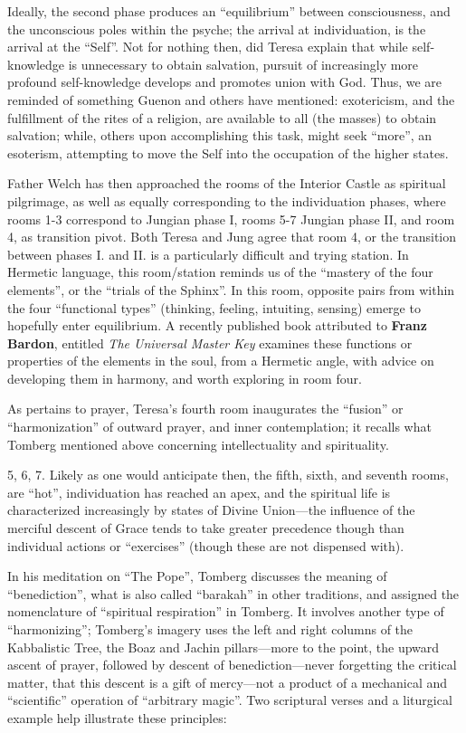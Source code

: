 Ideally, the second phase produces an ``equilibrium'' between consciousness, and the unconscious poles within the psyche; the arrival at individuation, is the arrival at the ``Self''. Not for nothing then, did Teresa explain that while self-knowledge is unnecessary to obtain salvation, pursuit of increasingly more profound self-knowledge develops and promotes union with God. Thus, we are reminded of something Guenon and others have mentioned: exotericism, and the fulfillment of the rites of a religion, are available to all (the masses) to obtain salvation; while, others upon accomplishing this task, might seek ``more'', an esoterism, attempting to move the Self into the occupation of the higher states.

Father Welch has then approached the rooms of the Interior Castle as spiritual pilgrimage, as well as equally corresponding to the individuation phases, where rooms 1-3 correspond to Jungian phase I, rooms 5-7 Jungian phase II, and room 4, as transition pivot. Both Teresa and Jung agree that room 4, or the transition between phases I. and II. is a particularly difficult and trying station. In Hermetic language, this room/station reminds us of the ``mastery of the four elements'', or the ``trials of the Sphinx''. In this room, opposite pairs from within the four ``functional types'' (thinking, feeling, intuiting, sensing) emerge to hopefully enter equilibrium. A recently published book attributed to \textbf{Franz Bardon}, entitled \emph{The Universal Master Key} examines these functions or properties of the elements in the soul, from a Hermetic angle, with advice on developing them in harmony, and worth exploring in room four.

As pertains to prayer, Teresa's fourth room inaugurates the ``fusion'' or ``harmonization'' of outward prayer, and inner contemplation; it recalls what Tomberg mentioned above concerning intellectuality and spirituality.

5, 6, 7. Likely as one would anticipate then, the fifth, sixth, and seventh rooms, are ``hot'', individuation has reached an apex, and the spiritual life is characterized increasingly by states of Divine Union---the influence of the merciful descent of Grace tends to take greater precedence though than individual actions or ``exercises'' (though these are not dispensed with).

In his meditation on ``The Pope'', Tomberg discusses the meaning of ``benediction'', what is also called ``barakah'' in other traditions, and assigned the nomenclature of ``spiritual respiration'' in Tomberg. It involves another type of ``harmonizing''; Tomberg's imagery uses the left and right columns of the Kabbalistic Tree, the Boaz and Jachin pillars---more to the point, the upward ascent of prayer, followed by descent of benediction---never forgetting the critical matter, that this descent is a gift of mercy---not a product of a mechanical and ``scientific'' operation of ``arbitrary magic''. Two scriptural verses and a liturgical example help illustrate these principles:

